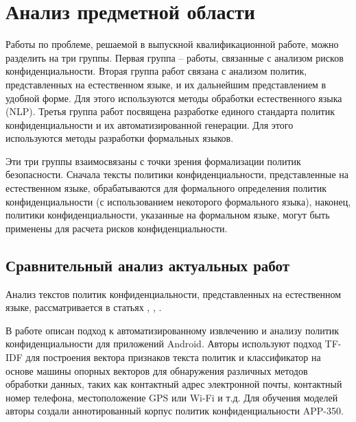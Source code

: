 \documentclass[../main]{subfiles}
\begin{document}
\newpage
\section{Анализ предметной области}
\label{sec:subject_domain}

Работы по проблеме, решаемой в выпускной квалификационной работе, можно разделить на три группы. Первая группа -- работы, связанные с анализом рисков конфиденциальности. Вторая группа работ связана с анализом политик, представленных на естественном языке, и их дальнейшим представлением в удобной форме. Для этого используются методы обработки естественного языка (NLP). Третья группа работ посвящена разработке единого стандарта политик конфиденциальности и их автоматизированной генерации. Для этого используются методы разработки формальных языков.

Эти три группы взаимосвязаны с точки зрения формализации политик безопасности. Сначала тексты политики конфиденциальности, представленные на естественном языке, обрабатываются для формального определения политик конфиденциальности (с использованием некоторого формального языка), наконец, политики конфиденциальности, указанные на формальном языке, могут быть применены для расчета рисков конфиденциальности.

\subsection{Сравнительный анализ актуальных работ}
Анализ текстов политик конфиденциальности, представленных на естественном языке, рассматривается в статьях \cite{MDPI5}, \cite{MDPI6}, \cite{MDPI9}.

В работе \cite{MDPI5} описан подход к автоматизированному извлечению и анализу политик конфиденциальности для приложений Android. Авторы используют подход TF-IDF для построения вектора признаков текста политик и классификатор на основе машины опорных векторов для обнаружения различных методов обработки данных, таких как контактный адрес электронной почты, контактный номер телефона, местоположение GPS или Wi-Fi и т.д. Для обучения моделей авторы создали аннотированный корпус политик конфиденциальности APP-350.
\end{document}
